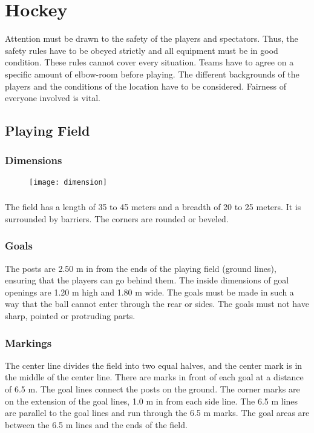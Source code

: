 \chapter{Hockey}
Attention must be drawn to the safety of the players and spectators. Thus, the safety rules have to be obeyed strictly and all
equipment must be in good condition. These rules cannot cover every situation. Teams have to agree on a specific amount
of elbow-room before playing. The different backgrounds of the players and the conditions of the location have to be
considered. Fairness of everyone involved is vital.

\section{Playing Field}

\subsection{Dimensions}

\begin{figure}[h]
\begin{center}
\texttt{[image: dimension]}
\end{center}
\end{figure}

\subsection{}
The field has a length of 35 to 45 meters and a breadth of 20 to 25 meters. It is surrounded by barriers. The corners are
rounded or beveled.

\subsection{Goals}
The posts are 2.50 m in from the ends of the playing field (ground lines), ensuring that the players can go behind them.
The inside dimensions of goal openings are 1.20 m high and 1.80 m wide. The goals must be made in such a way that
the ball cannot enter through the rear or sides. The goals must not have sharp, pointed or protruding parts.

\subsection{Markings}
The center line divides the field into two equal halves, and the center mark is in the middle of the center line. There are
marks in front of each goal at a distance of 6.5 m. The goal lines connect the posts on the ground. The corner marks are
on the extension of the goal lines, 1.0 m in from each side line. The 6.5 m lines are parallel to the goal lines and run
through the 6.5 m marks. The goal areas are between the 6.5 m lines and the ends of the field.

